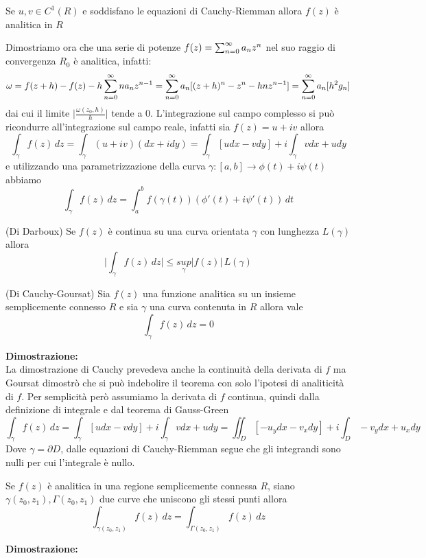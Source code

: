 \begin{thm}
Se $u,v\in C^1(R)$ e soddisfano le equazioni di Cauchy-Riemman allora $f(z)$ è analitica in $R$
\end{thm}
Dimostriamo ora che una serie di potenze $f(z) =\sum_{n=0}^\infty a_n z^n$ nel suo raggio di convergenza $R_0$ è analitica, infatti:
\[\omega = f(z+h)-f(z)-h\sum_{n=0}^\infty na_nz^{n-1} = \sum_{n=0}^\infty a_n[(z+h)^n-z^n-hnz^{n-1}]= \sum_{n=0}^\infty a_n[h^2g_n]\]
dai cui il limite $\bigg|\frac{\omega(z_0,h)}{h}\bigg|$ tende a 0.
\newline
L'integrazione sul campo complesso si può ricondurre all'integrazione sul campo reale, infatti sia $f(z) = u+iv$ allora
\[\int_\gamma f(z)\,dz = \int_\gamma (u +iv)(dx+idy) = \int_\gamma[udx-vdy] +i\int_\gamma vdx+udy\] 
e utilizzando una parametrizzazione della curva $\gamma: [a,b]\to \phi(t)+i\psi(t)$ abbiamo
\[\int_\gamma f(z)\,dz = \int_a^b f(\gamma(t))(\phi'(t)+i\psi'(t))\,dt\]
\begin{lem}
(Di Darboux) Se $f(z)$ è continua su una curva orientata $\gamma$ con lunghezza $L(\gamma)$ allora
\[\bigg|\int_\gamma f(z)\,dz \bigg| \leq \underset{\gamma}{sup}|f(z)|\,L(\gamma)\]
\end{lem}
\begin{thm}
(Di Cauchy-Goursat) Sia $f(z)$ una funzione analitica su un insieme semplicemente connesso $R$ e sia $\gamma$ una curva contenuta in $R$ allora vale
\[\int_\gamma f(z)\,dz=0\]
\end{thm}
\hspace{-1.6em}\textbf{Dimostrazione:}\\
La dimostrazione di Cauchy prevedeva anche la continuità della derivata di $f$ ma Goursat dimostrò che si può indebolire il teorema con solo l'ipotesi di analiticità di $f$. Per semplicità però
assumiamo la derivata di $f$ continua, quindi dalla definizione di integrale e dal teorema di Gauss-Green
\[\int_\gamma f(z)\,dz =  \int_\gamma[udx-vdy] +i\int_\gamma vdx+udy =  \iint_D[-u_ydx-v_xdy] +i\int_D -v_ydx+u_xdy\]
Dove $\gamma = \partial D$, dalle equazioni di Cauchy-Riemman segue che gli integrandi sono nulli per cui l'integrale è nullo.\\
\begin{lem}
Se $f(z)$ è analitica in una regione semplicemente connessa $R$, siano $\gamma(z_0,z_1),\Gamma(z_0,z_1)$ due curve che uniscono gli stessi punti allora
\[\int_{\gamma(z_0,z_1)}f(z)\,dz = \int_{\Gamma(z_0,z_1)}f(z)\,dz\]
\end{lem}
\hspace{-1.6em}\textbf{Dimostrazione:}\\
